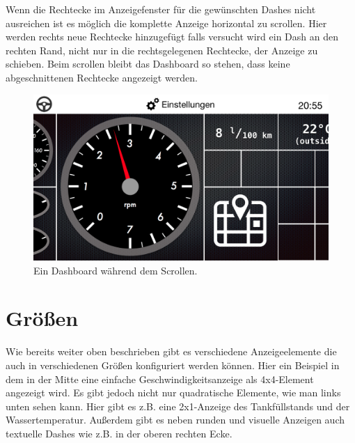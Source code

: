 \documentclass[pflichtenheft.tex]{subfiles}
\begin{document}
Wenn die Rechtecke im Anzeigefenster für die gewünschten Dashes nicht ausreichen ist es möglich die komplette Anzeige horizontal zu scrollen. Hier werden rechts neue Rechtecke hinzugefügt falls versucht wird ein Dash an den rechten Rand, nicht nur in die rechtsgelegenen Rechtecke, der Anzeige zu schieben. Beim scrollen bleibt das Dashboard so stehen, dass keine abgeschnittenen Rechtecke angezeigt werden. 

\begin{figure}[H]
  	\begin{center}
 		\includegraphics[width=\textwidth]{Images/GUI-DashboardGridScrolling.png}
  		\caption{Ein Dashboard während dem Scrollen.}
  	\end{center}
\end{figure}

\clearpage
\section{Größen}

Wie bereits weiter oben beschrieben gibt es verschiedene Anzeigeelemente die auch in verschiedenen Größen konfiguriert werden können. Hier ein Beispiel in dem in der Mitte eine einfache Geschwindigkeitsanzeige als 4x4-Element angezeigt wird. 
Es gibt jedoch nicht nur quadratische Elemente, wie man links unten sehen kann. Hier gibt es z.B. eine 2x1-Anzeige des Tankfüllstands und der Wassertemperatur. 
Außerdem gibt es neben runden und visuelle Anzeigen auch textuelle Dashes wie z.B. in der oberen rechten Ecke.
\end{document}
